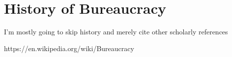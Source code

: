 \section{History of Bureaucracy}

I'm mostly going to skip history and merely cite other scholarly references


https://en.wikipedia.org/wiki/Bureaucracy